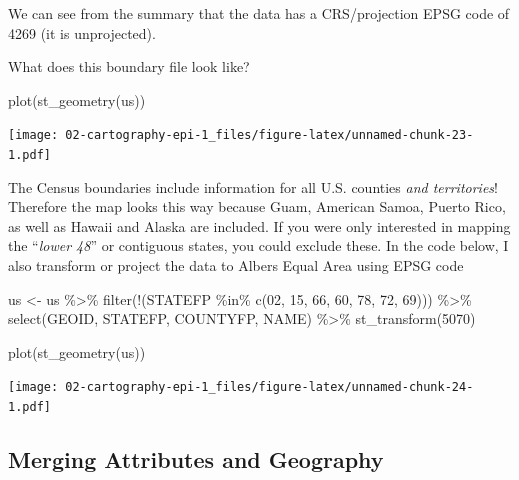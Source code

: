 \documentclass[
]{book}
\newenvironment{Shaded}{\begin{snugshade}}{\end{snugshade}}
\newcommand{\DecValTok}[1]{\textcolor[rgb]{0.00,0.00,0.81}{#1}}
\newcommand{\FunctionTok}[1]{\textcolor[rgb]{0.00,0.00,0.00}{#1}}
\newcommand{\NormalTok}[1]{#1}
\newcommand{\OtherTok}[1]{\textcolor[rgb]{0.56,0.35,0.01}{#1}}
\newcommand{\SpecialCharTok}[1]{\textcolor[rgb]{0.00,0.00,0.00}{#1}}
\newcommand{\StringTok}[1]{\textcolor[rgb]{0.31,0.60,0.02}{#1}}
\begin{document}
We can see from the summary that the data has a CRS/projection EPSG code of 4269 (it is unprojected).

What does this boundary file look like?

\begin{Shaded}
\begin{Highlighting}[]
\FunctionTok{plot}\NormalTok{(}\FunctionTok{st\_geometry}\NormalTok{(us))}
\end{Highlighting}
\end{Shaded}

\texttt{[image: 02-cartography-epi-1\_files/figure-latex/unnamed-chunk-23-1.pdf]}

The Census boundaries include information for all U.S. counties \emph{and territories}! Therefore the map looks this way because Guam, American Samoa, Puerto Rico, as well as Hawaii and Alaska are included. If you were only interested in mapping the ``\emph{lower 48}'' or contiguous states, you could exclude these. In the code below, I also transform or project the data to Albers Equal Area using EPSG code

\begin{Shaded}
\begin{Highlighting}[]
\NormalTok{us }\OtherTok{\textless{}{-}}\NormalTok{ us }\SpecialCharTok{\%\textgreater{}\%}
  \FunctionTok{filter}\NormalTok{(}\SpecialCharTok{!}\NormalTok{(STATEFP }\SpecialCharTok{\%in\%} \FunctionTok{c}\NormalTok{(}\StringTok{\textquotesingle{}02\textquotesingle{}}\NormalTok{, }\StringTok{\textquotesingle{}15\textquotesingle{}}\NormalTok{, }\StringTok{\textquotesingle{}66\textquotesingle{}}\NormalTok{, }\StringTok{\textquotesingle{}60\textquotesingle{}}\NormalTok{, }\StringTok{\textquotesingle{}78\textquotesingle{}}\NormalTok{, }\StringTok{\textquotesingle{}72\textquotesingle{}}\NormalTok{, }\StringTok{\textquotesingle{}69\textquotesingle{}}\NormalTok{))) }\SpecialCharTok{\%\textgreater{}\%}
  \FunctionTok{select}\NormalTok{(GEOID, STATEFP, COUNTYFP, NAME) }\SpecialCharTok{\%\textgreater{}\%}
  \FunctionTok{st\_transform}\NormalTok{(}\DecValTok{5070}\NormalTok{)}

\FunctionTok{plot}\NormalTok{(}\FunctionTok{st\_geometry}\NormalTok{(us))}
\end{Highlighting}
\end{Shaded}

\texttt{[image: 02-cartography-epi-1\_files/figure-latex/unnamed-chunk-24-1.pdf]}

\hypertarget{merging-attributes-and-geography}{%
\subsection{Merging Attributes and Geography}\label{merging-attributes-and-geography}}
\end{document}
